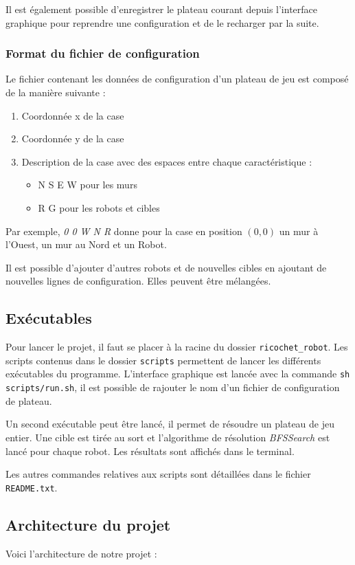 \documentclass[a4paper]{article} %
\begin{document}
Il est également possible d'enregistrer le plateau courant depuis l'interface graphique pour reprendre une configuration et de le recharger par la suite.

		\subsubsection{Format du fichier de configuration}\label{structFichier}
Le fichier contenant les données de configuration d'un plateau de jeu est composé de la manière suivante :
\begin{enumerate}
\item Coordonnée x de la case
\item Coordonnée y de la case
\item Description de la case avec des espaces entre chaque caractéristique :
\begin{itemize}
\item N S E W pour les murs
\item R G pour les robots et cibles
\end{itemize}
\end{enumerate}
Par exemple, \textsl{0 0 W N R} donne pour la case en position $(0,0)$ un mur à l'Ouest, un mur au Nord et un Robot.

Il est possible d'ajouter d'autres robots et de nouvelles cibles en ajoutant de nouvelles lignes de configuration. Elles peuvent être mélangées.

	\subsection{Exécutables}
Pour lancer le projet, il faut se placer à la racine du dossier \texttt{ricochet\_robot}. Les scripts contenus dans le dossier \texttt{scripts} permettent de lancer les différents exécutables du programme. L'interface graphique est lancée avec la commande  \texttt{sh  scripts/run.sh}, il est possible de rajouter le nom d'un fichier de configuration de plateau.

Un second exécutable peut être lancé, il permet de résoudre un plateau de jeu entier. Une cible est tirée au sort et l'algorithme de résolution \textsl{BFSSearch} est lancé pour chaque robot. Les résultats sont affichés dans le terminal. 

Les autres commandes relatives aux scripts sont détaillées dans le fichier \texttt{README.txt}.

	\subsection{Architecture du projet}
Voici l'architecture de notre projet :
\end{document}
